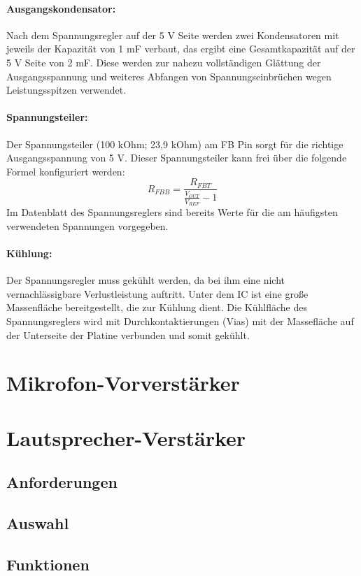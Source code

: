 \paragraph{Ausgangskondensator:}
Nach dem Spannungsregler auf der 5 V Seite werden zwei Kondensatoren mit jeweils der Kapazität von 1 mF verbaut, das ergibt eine Gesamtkapazität auf der 5 V Seite von 2 mF.
Diese werden zur nahezu vollständigen Glättung der Ausgangsspannung und weiteres Abfangen von Spannungseinbrüchen wegen Leistungsspitzen verwendet.

\paragraph{Spannungsteiler:}
Der Spannungsteiler (100 kOhm; 23,9 kOhm) am FB Pin sorgt für die richtige Ausgangsspannung von 5 V.
Dieser Spannungsteiler kann frei über die folgende Formel konfiguriert werden:
\[R_{FBB}=\frac{R_{FBT}}{\frac{V_{OUT}}{V_{REF}}-1}\]
Im Datenblatt des Spannungsreglers sind bereits Werte für die am häufigsten verwendeten Spannungen vorgegeben.

\paragraph{Kühlung:}
Der Spannungsregler muss gekühlt werden, da bei ihm eine nicht vernachlässigbare Verlustleistung auftritt.
Unter dem IC ist eine große Massenfläche bereitgestellt, die zur Kühlung dient.
Die Kühlfläche des Spannungsreglers wird mit Durchkontaktierungen (Vias) mit der Massefläche auf der Unterseite der Platine verbunden und somit gekühlt.

\section{Mikrofon-Vorverstärker}

\section{Lautsprecher-Verstärker}
\subsection{Anforderungen}
\subsection{Auswahl}
\subsection{Funktionen}
